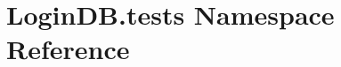 \hypertarget{namespace_login_d_b_1_1tests}{}\section{Login\+D\+B.\+tests Namespace Reference}
\label{namespace_login_d_b_1_1tests}
